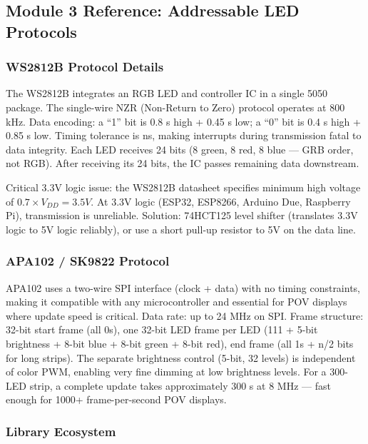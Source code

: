 \documentclass[11pt,letterpaper]{article}
\begin{document}
\subsection{Module 3 Reference: Addressable LED Protocols}

\subsubsection{WS2812B Protocol Details}

The WS2812B integrates an RGB LED and controller IC in a single 5050 package. The single-wire NZR (Non-Return to Zero) protocol operates at 800 kHz. Data encoding: a ``1'' bit is 0.8 \textmu s high + 0.45 \textmu s low; a ``0'' bit is 0.4 \textmu s high + 0.85 \textmu s low. Timing tolerance is  ns, making interrupts during transmission fatal to data integrity. Each LED receives 24 bits (8 green, 8 red, 8 blue --- GRB order, not RGB). After receiving its 24 bits, the IC passes remaining data downstream.

Critical 3.3V logic issue: the WS2812B datasheet specifies minimum high voltage of $0.7 \times V_{DD} = 3.5V$. At 3.3V logic (ESP32, ESP8266, Arduino Due, Raspberry Pi), transmission is unreliable. Solution: 74HCT125 level shifter (translates 3.3V logic to 5V logic reliably), or use a short pull-up resistor to 5V on the data line.

\subsubsection{APA102 / SK9822 Protocol}

APA102 uses a two-wire SPI interface (clock + data) with no timing constraints, making it compatible with any microcontroller and essential for POV displays where update speed is critical. Data rate: up to 24 MHz on SPI. Frame structure: 32-bit start frame (all 0s), one 32-bit LED frame per LED (111 + 5-bit brightness + 8-bit blue + 8-bit green + 8-bit red), end frame (all 1s + n/2 bits for long strips). The separate brightness control (5-bit, 32 levels) is independent of color PWM, enabling very fine dimming at low brightness levels. For a 300-LED strip, a complete update takes approximately 300 \textmu s at 8 MHz --- fast enough for 1000+ frame-per-second POV displays.

\subsubsection{Library Ecosystem}
\end{document}
